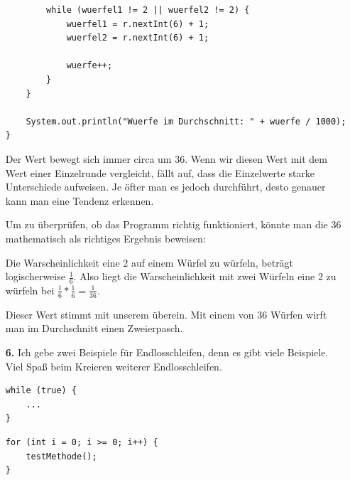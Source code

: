 \documentclass{scrartcl}   %
\begin{document}
\begin{itemize}
\begin{lstlisting}
        while (wuerfel1 != 2 || wuerfel2 != 2) {
            wuerfel1 = r.nextInt(6) + 1;
            wuerfel2 = r.nextInt(6) + 1;

            wuerfe++;
        }
    }
    
    System.out.println("Wuerfe im Durchschnitt: " + wuerfe / 1000);
}
    \end{lstlisting}
    
    Der Wert bewegt sich immer circa um 36. Wenn wir diesen Wert mit dem Wert einer Einzelrunde vergleicht, fällt auf, dass die Einzelwerte starke Unterschiede aufweisen. Je öfter man es jedoch durchführt, desto genauer kann man eine Tendenz erkennen.
    
    Um zu überprüfen, ob das Programm richtig funktioniert, könnte man die 36 mathematisch als richtiges Ergebnis beweisen:
    
    Die Warscheinlichkeit eine 2 auf einem Würfel zu würfeln, beträgt logischerweise $\frac{1}{6}$. Also liegt die Warscheinlichkeit mit zwei Würfeln eine 2 zu würfeln bei $\frac{1}{6} * \frac{1}{6} = \frac{1}{36}$.
    
    Dieser Wert stimmt mit unserem überein. Mit einem von 36 Würfen wirft man im Durchschnitt einen Zweierpasch.
    
    \newpage
    
    \item[\textbf{6.}] Ich gebe zwei Beispiele für Endlosschleifen, denn es gibt viele Beispiele. Viel Spaß beim Kreieren weiterer Endlosschleifen.\\
    \begin{lstlisting}
while (true) {
    ...
}
    \end{lstlisting}
    \begin{lstlisting}
for (int i = 0; i >= 0; i++) {
    testMethode();
}
    \end{lstlisting}
\end{itemize}
\end{document}
